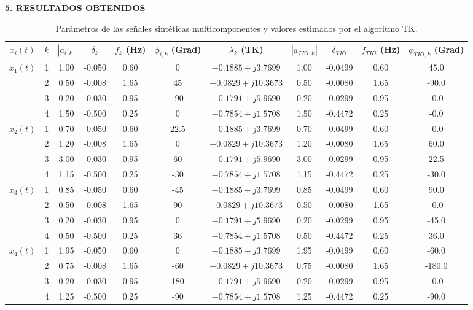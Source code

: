 \documentclass[final]{beamer}
\begin{document}
\begin{frame}[t]
\begin{columns}[t,totalwidth=\textwidth]
\begin{column}{0.49\textwidth}
\begin{block}{\textbf{5. RESULTADOS OBTENIDOS}}
\begin{table}[h!]
\centering
\caption{Parámetros de las señales sintéticas multicomponentes y valores estimados por el algoritmo TK.}
\label{tab:synthetic_signals}
\begin{tabular}{c c c c c c c c c c c}
\hline
\textbf{$x_i(t)$} & \textbf{$k$} & \textbf{$|a_{i,k}|$} & \textbf{$\delta_k$} & \textbf{$f_k$ (Hz)} & \textbf{$\phi_{i,k}$ (Grad)} & \textbf{$\lambda_k$ (TK)} & \textbf{$|a_{TK i,k}|$} & \textbf{$\delta_{TK i}$} & \textbf{$f_{TK i}$ (Hz)} & \textbf{$\phi_{TK i,k}$ (Grad)} \\
\hline
$x_1(t)$ & 1 & 1.00 & -0.050 & 0.60 & 0    & $-0.1885 + j3.7699$  & 1.00 & -0.0499 & 0.60 & 45.0 \\
         & 2 & 0.50 & -0.008 & 1.65 & 45   & $-0.0829 + j10.3673$ & 0.50 & -0.0080 & 1.65 & -90.0 \\
         & 3 & 0.20 & -0.030 & 0.95 & -90  & $-0.1791 + j5.9690$  & 0.20 & -0.0299 & 0.95 & -0.0 \\
         & 4 & 1.50 & -0.500 & 0.25 & 0    & $-0.7854 + j1.5708$  & 1.50 & -0.4472 & 0.25 & -0.0 \\[3pt]
$x_2(t)$ & 1 & 0.70 & -0.050 & 0.60 & 22.5 & $-0.1885 + j3.7699$  & 0.70 & -0.0499 & 0.60 & -0.0 \\
         & 2 & 1.20 & -0.008 & 1.65 & 0    & $-0.0829 + j10.3673$ & 1.20 & -0.0080 & 1.65 & 60.0 \\
         & 3 & 3.00 & -0.030 & 0.95 & 60   & $-0.1791 + j5.9690$  & 3.00 & -0.0299 & 0.95 & 22.5 \\
         & 4 & 1.15 & -0.500 & 0.25 & -30  & $-0.7854 + j1.5708$  & 1.15 & -0.4472 & 0.25 & -30.0 \\[3pt]
$x_3(t)$ & 1 & 0.85 & -0.050 & 0.60 & -45  & $-0.1885 + j3.7699$  & 0.85 & -0.0499 & 0.60 & 90.0 \\
         & 2 & 0.50 & -0.008 & 1.65 & 90   & $-0.0829 + j10.3673$ & 0.50 & -0.0080 & 1.65 & -0.0 \\
         & 3 & 0.20 & -0.030 & 0.95 & 0    & $-0.1791 + j5.9690$  & 0.20 & -0.0299 & 0.95 & -45.0 \\
         & 4 & 0.50 & -0.500 & 0.25 & 36   & $-0.7854 + j1.5708$  & 0.50 & -0.4472 & 0.25 & 36.0 \\[3pt]
$x_4(t)$ & 1 & 1.95 & -0.050 & 0.60 & 0    & $-0.1885 + j3.7699$  & 1.95 & -0.0499 & 0.60 & -60.0 \\
         & 2 & 0.75 & -0.008 & 1.65 & -60  & $-0.0829 + j10.3673$ & 0.75 & -0.0080 & 1.65 & -180.0 \\
         & 3 & 0.20 & -0.030 & 0.95 & 180  & $-0.1791 + j5.9690$  & 0.20 & -0.0299 & 0.95 & -0.0 \\
         & 4 & 1.25 & -0.500 & 0.25 & -90  & $-0.7854 + j1.5708$  & 1.25 & -0.4472 & 0.25 & -90.0 \\
\hline
\end{tabular}
\end{table}



\end{block}
\end{column}
\end{columns}
\end{frame}
\end{document}
